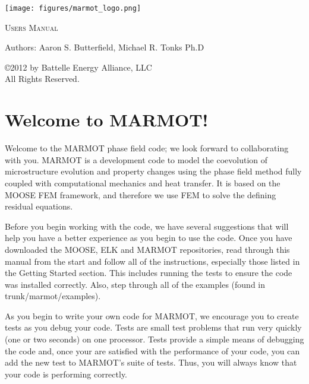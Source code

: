 \documentclass[letter,12pt,fleqn]{article}
\begin{document}
\begin{titlepage}

\begin{center}

 \texttt{[image: figures/marmot\_logo.png]}
 
 \vspace{20pt}

\textsc{\huge Users Manual}

 \vspace{20pt}


Authors: Aaron S. Butterfield, Michael R. Tonks Ph.D

\date{}

\end{center}

\vfill	
\begin{center}
\copyright 2012 by Battelle Energy Alliance, LLC\\
All Rights Reserved.
\end{center}

\thispagestyle{empty}

\end{titlepage}


\tableofcontents

\newpage

\section{Welcome to MARMOT!}

Welcome to the MARMOT phase field code; we look forward to collaborating with you.  MARMOT is a development code to model the coevolution of microstructure evolution and property changes using the phase field method fully coupled with computational mechanics and heat transfer.  It is based on the MOOSE FEM framework, and therefore we use FEM to solve the defining residual equations.  

Before you begin working with the code, we have several suggestions that will help you have a better experience as you begin to use the code.  Once you have downloaded the MOOSE, ELK and MARMOT repositories, read through this manual from the start and follow all of the instructions, especially those listed in the Getting Started section.  This includes running the tests to ensure the code was installed correctly.  Also, step through all of the examples (found in trunk/marmot/examples).

As you begin to write your own code for MARMOT, we encourage you to create tests as you debug your code.  Tests are small test problems that run very quickly (one or two seconds) on one processor.  Tests provide a simple means of debugging the code and, once your are satisfied with the performance of your code, you can add the new test to MARMOT's suite of tests.  Thus, you will always know that your code is performing correctly.
\end{document}
